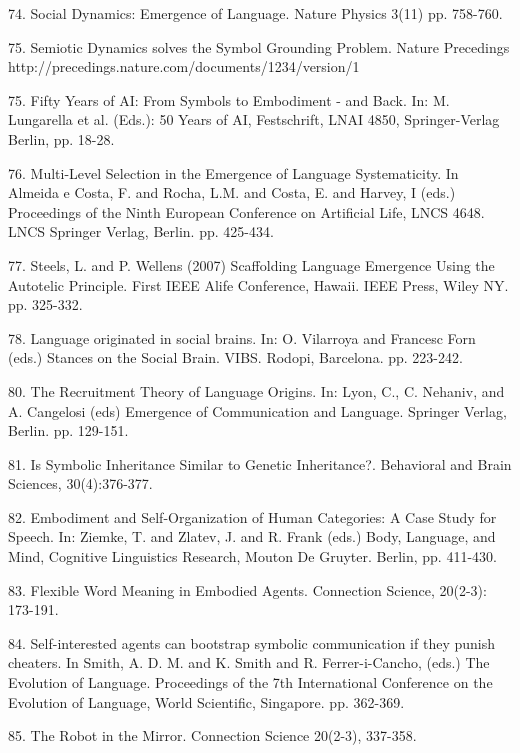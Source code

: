 74. \citet{Loreto:07a} Social Dynamics: Emergence of Language. Nature Physics 3(11) pp. 758-760. 

75. \citet{Steels:07b} Semiotic Dynamics solves the Symbol Grounding Problem. Nature Precedings 
http://precedings.nature.com/documents/1234/version/1

75. \citet{Steels:07c} Fifty Years of AI: From Symbols to Embodiment - and Back.  In: M. Lungarella et al. (Eds.): 50 Years of AI, Festschrift, LNAI 4850, Springer-Verlag Berlin, pp. 18-28. 

76. \citet{vantrijp:07d} Multi-Level Selection in the Emergence of Language Systematicity. In Almeida e Costa, F. and Rocha, L.M. and Costa, E. and Harvey, I (eds.) Proceedings of the Ninth European Conference on Artificial Life, LNCS 4648.
LNCS Springer Verlag, Berlin. pp. 425-434. 

77. \citet{Steels:07e} Steels, L. and P. Wellens (2007) Scaffolding Language Emergence Using the Autotelic Principle. 
First IEEE Alife Conference, Hawaii. IEEE Press, Wiley NY. pp. 325-332. 

78. \citet{Steels:07f} Language originated in social brains. In: O. Vilarroya and Francesc Forn (eds.) Stances on the Social Brain. VIBS. Rodopi, Barcelona. pp. 223-242. 

80. \citet{Steels:07g} The Recruitment Theory of Language Origins. In: Lyon, C., C. Nehaniv, and A. Cangelosi (eds) Emergence of Communication and Language. Springer Verlag, Berlin. pp. 129-151. 

81. \citet{Steels:07h} Is Symbolic Inheritance Similar to Genetic Inheritance?. Behavioral and Brain Sciences, 30(4):376-377.

82. \citet{Steels:07i} Embodiment and Self-Organization of Human Categories: A Case Study for Speech. In: Ziemke, T. and Zlatev, J. and R. Frank (eds.) Body, Language, and Mind, Cognitive Linguistics Research, Mouton De Gruyter. Berlin, pp. 411-430. 

83. \citet{Wellens:08a} Flexible Word Meaning in Embodied Agents. Connection Science, 20(2-3): 173-191. 

84. \citet{Wang:08b} Self-interested agents can bootstrap symbolic communication if they punish cheaters. In Smith, A. D. M. and K. Smith and R. Ferrer-i-Cancho, (eds.) The Evolution of Language. Proceedings of the 7th International Conference on the Evolution of Language, World Scientific, Singapore. pp. 362-369. 

85. \citet{Steels:08c} The Robot in the Mirror. Connection Science 20(2-3), 337-358. 

